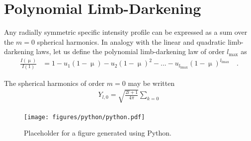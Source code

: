 \documentclass[modern]{aastex61}
\begin{document}
%
\section{Polynomial Limb-Darkening}
\label{sec:quad}

Any radially symmetric specific intensity profile can be expressed as a sum
over the $m = 0$ spherical harmonics. In analogy with the linear and quadratic
limb-darkening laws, let us define the polynomial limb-darkening law of
order $l_\mathrm{max}$ as
%
%
\begin{align}
    \label{eq:polynomialld}
    \frac{I(\upmu)}{I(1)} &= 1 - u_1 (1 - \upmu) - u_2 (1 - \upmu)^2 - ... - u_{l_\mathrm{lmax}}(1 - \upmu)^{l_\mathrm{lmax}}
    \quad.
\end{align}
%

The spherical harmonics of order $m = 0$ may be written
%
\begin{align}
    Y_{l,0} = \sqrt{\frac{2l + 1}{4\pi}}
              \sum_{k=0}
\end{align}

\begin{figure}[t!]
    \begin{centering}
    \texttt{[image: figures/python/python.pdf]}
    \caption{\label{fig:python} Placeholder for a figure generated using Python.}
    \end{centering}
\end{figure}



\end{document}
